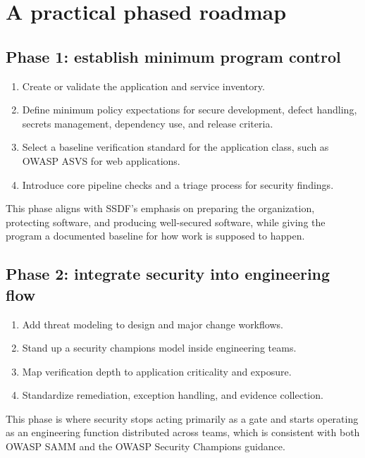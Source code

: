 \documentclass[11pt]{article}
\begin{document}
\section{A practical phased roadmap}
\subsection{Phase 1: establish minimum program control}
\begin{enumerate}
  \item Create or validate the application and service inventory.
  \item Define minimum policy expectations for secure development, defect handling, secrets management, dependency use, and release criteria.
  \item Select a baseline verification standard for the application class, such as OWASP ASVS for web applications.
  \item Introduce core pipeline checks and a triage process for security findings.
\end{enumerate}
This phase aligns with SSDF's emphasis on preparing the organization, protecting software, and producing well-secured software, while giving the program a documented baseline for how work is supposed to happen.\cite{nist-ssdf,owasp-asvs}

\subsection{Phase 2: integrate security into engineering flow}
\begin{enumerate}
  \item Add threat modeling to design and major change workflows.
  \item Stand up a security champions model inside engineering teams.
  \item Map verification depth to application criticality and exposure.
  \item Standardize remediation, exception handling, and evidence collection.
\end{enumerate}
This phase is where security stops acting primarily as a gate and starts operating as an engineering function distributed across teams, which is consistent with both OWASP SAMM and the OWASP Security Champions guidance.\cite{owasp-samm,owasp-champions,owasp-threat-modeling}
\end{document}
